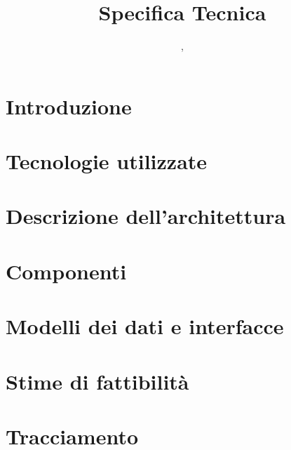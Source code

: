 


\author{\GG, \MM}
\supervisor{\LB, \AZ}
\dest{\ALL}
\title{Specifica Tecnica}


\maketitle

\tableofcontents
\newpage



\section{Introduzione}


\section{Tecnologie utilizzate}


\section{Descrizione dell'architettura}


\section{Componenti}


\section{Modelli dei dati e interfacce}


\section{Stime di fattibilità}


\section{Tracciamento}





